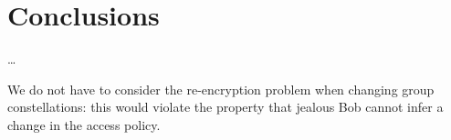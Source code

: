 %
%
%
%


\section{Conclusions}\label{Conclusions}

\dots

We do not have to consider the re-encryption problem when changing group 
constellations: this would violate the property that jealous Bob cannot infer 
a change in the access policy.

